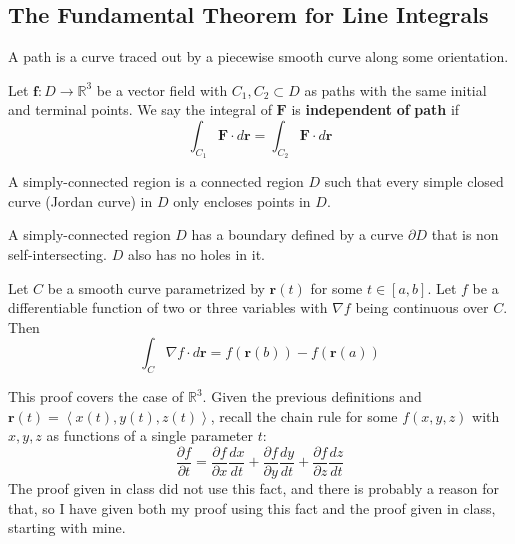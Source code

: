 \begin{intuition}
\section{The Fundamental Theorem for Line Integrals}
\begin{definition}[Path]
    A path is a curve traced out by a piecewise smooth curve along some orientation.
\end{definition}
\begin{definition}
    Let \(\mathbf{f}:D\to \mathbb{R}^3\) be a vector field with \(C_1,C_2 \subset D\) as paths with the same initial and terminal points. We say the integral of \(\mathbf{F}\) is \textbf{independent} \textbf{of} \textbf{path} if
    \[
        \int_{C_1}\mathbf{F}\cdot d \mathbf{r}=\int_{C_2}\mathbf{F}\cdot d \mathbf{r}
    \]
\end{definition}
\begin{definition}
    A simply-connected region is a connected region \(D\) such that every simple closed curve (Jordan curve) in \(D\) only encloses points in \(D\).
\end{definition}
\begin{intuition}
    A simply-connected region \(D\) has a boundary defined by a curve \(\partial D\) that is non self-intersecting. \(D\) also has no holes in it.
\end{intuition}
\begin{theorem}\label{ftc:line}
    Let \(C\) be a smooth curve parametrized by \(\mathbf{r}(t)\) for some \(t\in[a,b]\). Let \(f\) be a differentiable function of two or three variables with \(\nabla f\) being continuous over \(C\). Then 
    \[
        \int_C \nabla f\cdot d \mathbf{r}=f(\mathbf{r}(b))-f(\mathbf{r}(a))
    \]
\end{theorem}
\begin{longproof}
    This proof covers the case of \(\mathbb{R}^3\). Given the previous definitions and \(\mathbf{r}(t)=\left\langle x(t),y(t),z(t) \right\rangle \), recall the chain rule for some \(f(x,y,z)\) with \(x,y,z\) as functions of a single parameter \(t\):
    \[
        \frac{\partial f}{\partial t}= \frac{\partial f}{\partial x} \frac{dx}{dt} + \frac{\partial f}{\partial y} \frac{dy}{dt} +\frac{\partial f}{\partial z} \frac{dz}{dt} 
    \]
    The proof given in class did not use this fact, and there is probably a reason for that, so I have given both my proof using this fact and the proof given in class, starting with mine.
    \begin{align*}

\end{align*}
\end{longproof}
\end{intuition}
